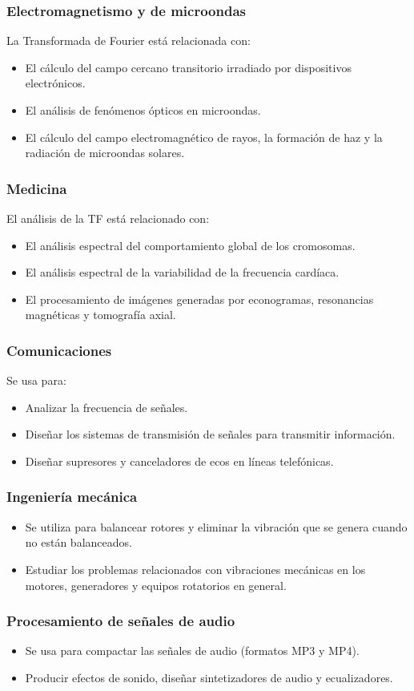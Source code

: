 \begin{frame}
\frametitle{Electromagnetismo y de microondas}
La Transformada de Fourier está relacionada con:
\begin{itemize}[<+->]
\item El cálculo del campo cercano transitorio irradiado por dispositivos electrónicos.
\item El análisis de fenómenos ópticos en microondas.
\item El cálculo del campo electromagnético de rayos, la formación de haz y la radiación de microondas solares.
\end{itemize}
\end{frame}
\begin{frame}
\frametitle{Medicina}
El análisis de la TF está relacionado con:
\begin{itemize}[<+->]
\item El análisis espectral del comportamiento global de los cromosomas.
\item El análisis espectral de la variabilidad de la frecuencia cardíaca.
\item El procesamiento de imágenes generadas por econogramas, resonancias magnéticas y tomografía axial.
\end{itemize}
\end{frame}
\begin{frame}
\frametitle{Comunicaciones}
Se usa para:
\begin{itemize}[<+->]
\item Analizar la frecuencia de señales.
\item Diseñar los sistemas de transmisión de señales para transmitir información.
\item Diseñar supresores y canceladores de ecos en líneas telefónicas.
\end{itemize}
\end{frame}
\begin{frame}
\frametitle{Ingeniería mecánica}
\begin{itemize}[<+->]
\item  Se utiliza para balancear rotores y eliminar la vibración que se genera cuando no están balanceados.
\item Estudiar los problemas relacionados con vibraciones mecánicas en los motores, generadores y equipos rotatorios en general.
\end{itemize}
\end{frame}
\begin{frame}
\frametitle{Procesamiento de señales de audio}
\begin{itemize}[<+->]
\item Se usa para compactar las señales de audio (formatos MP3 y MP4).
\item Producir efectos de sonido, diseñar sintetizadores de audio y ecualizadores.
\end{itemize}
\end{frame}
